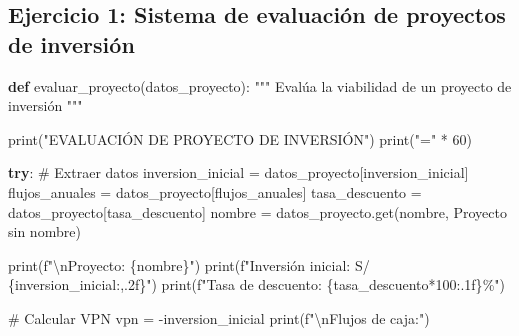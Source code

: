 \documentclass[
  doc,
  floatsintext,
  longtable,
  a4paper,
  nolmodern,
  notxfonts,
  notimes,
  12pt,
  colorlinks=true,linkcolor=blue,citecolor=blue,urlcolor=blue]{apa7}
\newenvironment{Shaded}{\begin{snugshade}}{\end{snugshade}}
\newcommand{\BuiltInTok}[1]{\textcolor[rgb]{0.00,0.23,0.31}{#1}}
\newcommand{\CharTok}[1]{\textcolor[rgb]{0.13,0.47,0.30}{#1}}
\newcommand{\CommentTok}[1]{\textcolor[rgb]{0.37,0.37,0.37}{#1}}
\newcommand{\ControlFlowTok}[1]{\textcolor[rgb]{0.00,0.23,0.31}{\textbf{#1}}}
\newcommand{\DecValTok}[1]{\textcolor[rgb]{0.68,0.00,0.00}{#1}}
\newcommand{\KeywordTok}[1]{\textcolor[rgb]{0.00,0.23,0.31}{\textbf{#1}}}
\newcommand{\NormalTok}[1]{\textcolor[rgb]{0.00,0.23,0.31}{#1}}
\newcommand{\OperatorTok}[1]{\textcolor[rgb]{0.37,0.37,0.37}{#1}}
\newcommand{\SpecialCharTok}[1]{\textcolor[rgb]{0.37,0.37,0.37}{#1}}
\newcommand{\SpecialStringTok}[1]{\textcolor[rgb]{0.13,0.47,0.30}{#1}}
\newcommand{\StringTok}[1]{\textcolor[rgb]{0.13,0.47,0.30}{#1}}
\begin{document}
\subsection{Ejercicio 1: Sistema de evaluación de proyectos de
inversión}\label{ejercicio-1-sistema-de-evaluaciuxf3n-de-proyectos-de-inversiuxf3n}

\begin{Shaded}
\begin{Highlighting}[]
\KeywordTok{def}\NormalTok{ evaluar\_proyecto(datos\_proyecto):}
    \CommentTok{"""}
\CommentTok{    Evalúa la viabilidad de un proyecto de inversión}
\CommentTok{    """}
    
    \BuiltInTok{print}\NormalTok{(}\StringTok{"EVALUACIÓN DE PROYECTO DE INVERSIÓN"}\NormalTok{)}
    \BuiltInTok{print}\NormalTok{(}\StringTok{"="} \OperatorTok{*} \DecValTok{60}\NormalTok{)}
    
    \ControlFlowTok{try}\NormalTok{:}
        \CommentTok{\# Extraer datos}
\NormalTok{        inversion\_inicial }\OperatorTok{=}\NormalTok{ datos\_proyecto[}\StringTok{\textquotesingle{}inversion\_inicial\textquotesingle{}}\NormalTok{]}
\NormalTok{        flujos\_anuales }\OperatorTok{=}\NormalTok{ datos\_proyecto[}\StringTok{\textquotesingle{}flujos\_anuales\textquotesingle{}}\NormalTok{]}
\NormalTok{        tasa\_descuento }\OperatorTok{=}\NormalTok{ datos\_proyecto[}\StringTok{\textquotesingle{}tasa\_descuento\textquotesingle{}}\NormalTok{]}
\NormalTok{        nombre }\OperatorTok{=}\NormalTok{ datos\_proyecto.get(}\StringTok{\textquotesingle{}nombre\textquotesingle{}}\NormalTok{, }\StringTok{\textquotesingle{}Proyecto sin nombre\textquotesingle{}}\NormalTok{)}
        
        \BuiltInTok{print}\NormalTok{(}\SpecialStringTok{f"}\CharTok{\textbackslash{}n}\SpecialStringTok{Proyecto: }\SpecialCharTok{\{}\NormalTok{nombre}\SpecialCharTok{\}}\SpecialStringTok{"}\NormalTok{)}
        \BuiltInTok{print}\NormalTok{(}\SpecialStringTok{f"Inversión inicial: S/ }\SpecialCharTok{\{}\NormalTok{inversion\_inicial}\SpecialCharTok{:,.2f\}}\SpecialStringTok{"}\NormalTok{)}
        \BuiltInTok{print}\NormalTok{(}\SpecialStringTok{f"Tasa de descuento: }\SpecialCharTok{\{}\NormalTok{tasa\_descuento}\OperatorTok{*}\DecValTok{100}\SpecialCharTok{:.1f\}}\SpecialStringTok{\%"}\NormalTok{)}
        
        \CommentTok{\# Calcular VPN}
\NormalTok{        vpn }\OperatorTok{=} \OperatorTok{{-}}\NormalTok{inversion\_inicial}
        \BuiltInTok{print}\NormalTok{(}\SpecialStringTok{f"}\CharTok{\textbackslash{}n}\SpecialStringTok{Flujos de caja:"}\NormalTok{)}
        

\end{Highlighting}
\end{Shaded}
\end{document}
